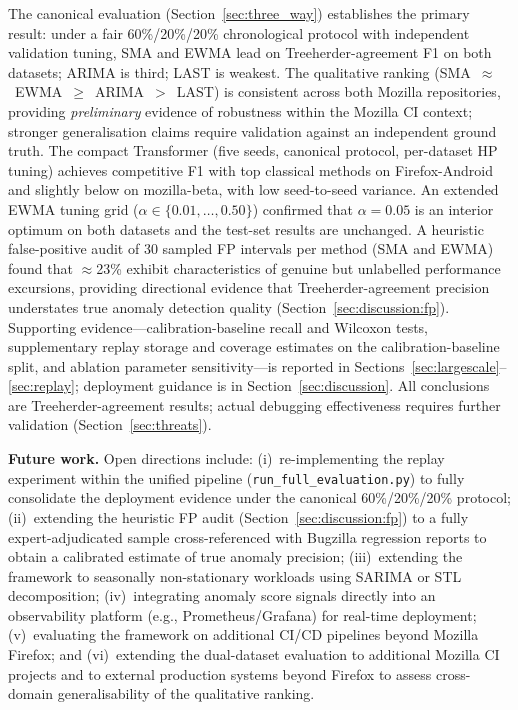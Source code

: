 \documentclass[a4paper,fleqn]{cas-sc}
\theoremstyle{plain}
\begin{document}
The canonical evaluation (Section~\ref{sec:three_way}) establishes the
primary result: under a fair 60\%/20\%/20\% chronological protocol with
independent validation tuning, SMA and EWMA lead on Treeherder-agreement
F1 on both datasets; ARIMA is third; LAST is weakest.
The qualitative ranking (SMA~$\approx$~EWMA~$\geq$~ARIMA~$>$~LAST) is
consistent across both Mozilla repositories, providing \emph{preliminary}
evidence of robustness within the Mozilla CI context; stronger
generalisation claims require validation against an independent ground truth.
The compact Transformer (five seeds, canonical protocol, per-dataset HP tuning)
achieves competitive F1 with top classical methods on Firefox-Android and
slightly below on mozilla-beta, with low seed-to-seed variance.
An extended EWMA tuning grid ($\alpha \in \{0.01,\ldots,0.50\}$) confirmed
that $\alpha=0.05$ is an interior optimum on both datasets and the
test-set results are unchanged.
A heuristic false-positive audit of 30 sampled FP intervals per method
(SMA and EWMA) found that $\approx$23\% exhibit characteristics of genuine
but unlabelled performance excursions, providing directional evidence that
Treeherder-agreement precision understates true anomaly detection quality
(Section~\ref{sec:discussion:fp}).
Supporting evidence---calibration-baseline recall and Wilcoxon tests,
supplementary replay storage and coverage estimates on the calibration-baseline
split, and ablation parameter sensitivity---is reported in
Sections~\ref{sec:largescale}--\ref{sec:replay}; deployment guidance is
in Section~\ref{sec:discussion}.
All conclusions are Treeherder-agreement results; actual debugging
effectiveness requires further validation (Section~\ref{sec:threats}).

\textbf{Future work.}
Open directions include:
(i)~re-implementing the replay experiment within the unified pipeline
(\texttt{run\_full\_evaluation.py}) to fully consolidate the deployment
evidence under the canonical 60\%/20\%/20\% protocol;
(ii)~extending the heuristic FP audit (Section~\ref{sec:discussion:fp})
to a fully expert-adjudicated sample cross-referenced with Bugzilla
regression reports to obtain a calibrated estimate of true anomaly precision;
(iii)~extending the framework to seasonally non-stationary workloads using
SARIMA or STL decomposition;
(iv)~integrating anomaly score signals directly into an observability platform
(e.g., Prometheus/Grafana) for real-time deployment;
(v)~evaluating the framework on additional CI/CD pipelines beyond Mozilla
Firefox; and
(vi)~extending the dual-dataset evaluation to additional Mozilla CI projects
and to external production systems beyond Firefox to assess cross-domain
generalisability of the qualitative ranking.
\end{document}
